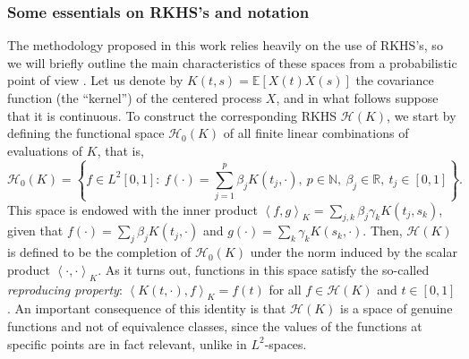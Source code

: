 \documentclass{article}
\numberwithin{equation}{section}
\theoremstyle{plain}
\theoremstyle{definition}
\newcommand{\N}{\mathbb{N}}
\newcommand{\R}{\mathbb{R}}
\newcommand{\Hcal}{\mathcal{H}}
\newcommand\dotprod[2]{\left\langle#1,#2\right\rangle}
\begin{document}
\subsubsection*{Some essentials on RKHS's and notation}\label{sec:rkhs}

The methodology proposed in this work relies heavily on the use of RKHS's, so we will briefly outline the main characteristics of these spaces from a probabilistic point of view \citep[for a more detailed account, see][]{berlinet2004reproducing}. Let us denote by \(K(t, s)= \mathbb E[X(t)X(s)]\) the covariance function (the ``kernel'') of the centered process \(X\), and in what follows suppose that it is continuous. To construct the corresponding RKHS \(\Hcal(K)\), we start by defining the functional space \(\Hcal_0(K)\) of all finite linear combinations of evaluations of \(K\), that is,
\begin{equation}\label{eq:h0}
  \Hcal_0(K) = \left\{ f \in L^2[0,1]: \ f(\cdot) = \sum_{j=1}^p \beta_j K(t_j, \cdot), \ p \in \N, \ \beta_j \in \R, \ t_j \in [0, 1] \right\}.
\end{equation}
This space is endowed with the inner product \(\dotprod{f}{g}_K = \sum_{j, k} \beta_j \gamma_k K(t_j, s_k)\), given that \(f(\cdot)=\sum_j \beta_j K(t_j, \cdot) \) and \(g(\cdot)=\sum_k \gamma_k K(s_k, \cdot)\). Then, \(\Hcal(K)\) is defined to be the completion of \(\Hcal_0(K)\) under the norm induced by the scalar product \(\dotprod{\cdot}{\cdot}_K\). As it turns out, functions in this space satisfy the so-called \textit{reproducing property}: \(\dotprod{K(t, \cdot)}{f}_K = f(t)\) for all \(f \in \Hcal(K)\) and \(t \in [0, 1]\). An important consequence of this identity is that \(\Hcal(K)\) is a space of genuine functions and not of equivalence classes, since the values of the functions at specific points are in fact relevant, unlike in \(L^2\)-spaces.
\end{document}
